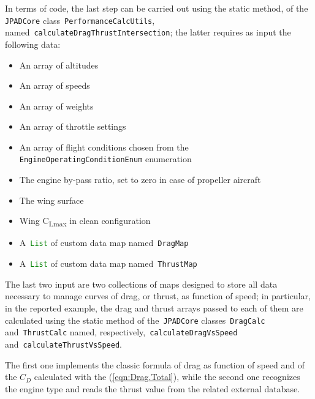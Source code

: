 In terms of code, the last step can be carried out using the static method, of the \lstinline[language=Java]!JPADCore! class~\lstinline[language=Java]!PerformanceCalcUtils!, named~\lstinline[language=Java]!calculateDragThrustIntersection!; the latter requires as input the following data:

\begin{itemize}
\item An array of altitudes
\item An array of speeds
\item An array of weights
\item An array of throttle settings
\item An array of flight conditions chosen from the \lstinline[language=Java]!EngineOperatingConditionEnum! enumeration
\item The engine by-pass ratio, set to zero in case of propeller aircraft
\item The wing surface
\item Wing C\textsubscript{Lmax} in clean configuration
\item A~\lstinline[language=Java]!List! of custom data map named~\lstinline[language=Java]!DragMap!
\item A~\lstinline[language=Java]!List! of custom data map named~\lstinline[language=Java]!ThrustMap!
\end{itemize}

\bigskip
\noindent
The last two input are two collections of maps designed to store all data necessary to manage curves of drag, or thrust, as function of speed; in particular, in the reported example, the drag and thrust arrays passed to each of them are calculated using the static method of the~\lstinline[language=Java]!JPADCore! classes~\lstinline[language=Java]!DragCalc! and~\lstinline[language=Java]!ThrustCalc! named, respectively,~\lstinline[language=Java]!calculateDragVsSpeed! and~\lstinline[language=Java]!calculateThrustVsSpeed!. 

The first one implements the classic formula of drag as function of speed and of the $C_{D}$ calculated with the (\ref{eqn:Drag.Total}), while the second one recognizes the engine type and reads the thrust value from the related external database.

